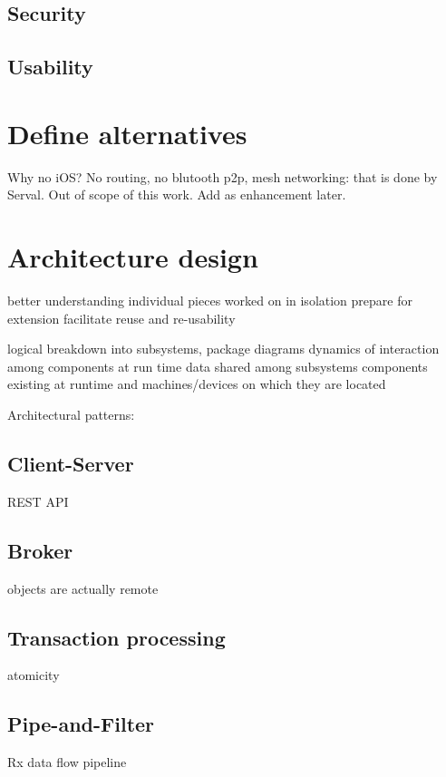 \subsection{Security}

\subsection{Usability}





\section{Define alternatives} %



Why no iOS?
No routing, no blutooth p2p, mesh networking: that is done by Serval. Out of scope of this work. Add as enhancement later.


\section{Architecture design}

better understanding
individual pieces worked on in isolation
prepare for extension
facilitate reuse and re-usability

logical breakdown into subsystems, package diagrams
dynamics of interaction among components at run time
data shared among subsystems
components existing at runtime and machines/devices on which they are located

Architectural patterns:

\subsection{Client-Server}
REST API

\subsection{Broker}
objects are actually remote

\subsection{Transaction processing}
atomicity

\subsection{Pipe-and-Filter}
Rx data flow pipeline

